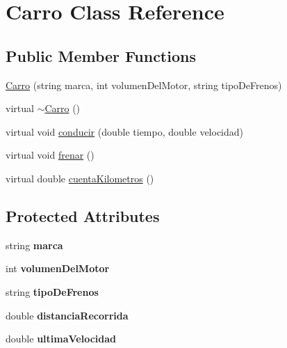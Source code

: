 \hypertarget{classCarro}{}\section{Carro Class Reference}
\label{classCarro}
\subsection*{Public Member Functions}
\begin{DoxyCompactItemize}
\item 
\hyperlink{classCarro_aaa935af175e59e77323cfdb1696fabd8}{Carro} (string marca, int volumen\+Del\+Motor, string tipo\+De\+Frenos)
\item 
virtual \hyperlink{classCarro_a7e31c4a7fba7088be8cef8b499c128bd}{$\sim$\+Carro} ()
\item 
virtual void \hyperlink{classCarro_a3b5c25a896658008e366b19023d36e89}{conducir} (double tiempo, double velocidad)
\item 
virtual void \hyperlink{classCarro_a0e55d35b86532d04dbbb56087fbd2079}{frenar} ()
\item 
virtual double \hyperlink{classCarro_a063538e705b4f696a13e147b52ded211}{cuenta\+Kilometros} ()
\end{DoxyCompactItemize}
\subsection*{Protected Attributes}
\begin{DoxyCompactItemize}
\item 
\mbox{\label{classCarro_a2ee525f9baf2d860ead24b04dcc67e88}} 
string {\bfseries marca}
\item 
\mbox{\label{classCarro_a36063622b77d9283a76e94757115b541}} 
int {\bfseries volumen\+Del\+Motor}
\item 
\mbox{\label{classCarro_ac2efb0916962ca3d448d4915250ef50d}} 
string {\bfseries tipo\+De\+Frenos}
\item 
\mbox{\label{classCarro_ab32b053ecd3967d8dafd050cc79d385a}} 
double {\bfseries distancia\+Recorrida}
\item 
\mbox{\label{classCarro_ad29bc08f69c5f2d3581431c829181db8}} 
double {\bfseries ultima\+Velocidad}
\end{DoxyCompactItemize}


